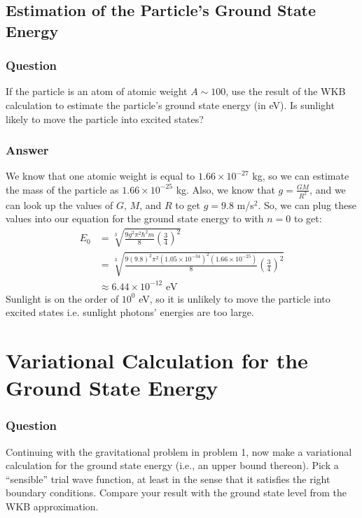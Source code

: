 \documentclass{article}[16pt]
\begin{document}
\subsection{Estimation of the Particle’s Ground State Energy}
\subsubsection{Question}
If the particle is an atom of atomic weight $A \sim 100$, use the result of the WKB calculation to estimate the particle’s ground state energy (in eV). Is sunlight likely to move the particle into excited states?

\subsubsection{Answer}
We know that one atomic weight is equal to $1.66 \times 10^{-27}$ kg, so we can estimate the mass of the particle as $1.66 \times 10^{-25}$ kg. Also, we know that $g = \frac{GM}{R^2}$, and we can look up the values of $G$, $M$, and $R$ to get $g = 9.8$ m/s$^2$. So, we can plug these values into our equation for the ground state energy to with $n=0$ to get:
\begin{align*}
    E_0 &= \sqrt[3]{\frac{9g^2\pi^2 \hbar^2m}{8} (\frac{3}{4})^2} \\
    &= \sqrt[3]{\frac{9(9.8)^2\pi^2 (1.05 \times 10^{-34})^2(1.66 \times 10^{-25})}{8} (\frac{3}{4})^2} \\
    &\approx 6.44 \times 10^{-12} \text{ eV}
\end{align*}
Sunlight is on the order of $10^0$ eV, so it is unlikely to move the particle into excited states i.e. sunlight photons' energies are too large.


\section{Variational Calculation for the Ground State Energy}
\subsubsection{Question}
Continuing with the gravitational problem in problem 1, now make a variational calculation for the ground state energy (i.e., an upper bound thereon). Pick a “sensible” trial wave function, at least in the sense that it satisfies the right boundary conditions. Compare your result with the ground state level from the WKB approximation.
\end{document}
